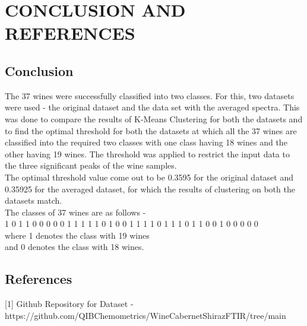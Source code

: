 \documentclass{article}
\begin{document}
\newpage
\section{CONCLUSION AND REFERENCES} 
\subsection{Conclusion}
The 37 wines were successfully classified into two classes. For this, two datasets were used - the original dataset and the data set with the averaged spectra. This was done to compare the results of K-Means Clustering for both the datasets and to find the optimal threshold for both the datasets at which all the 37 wines are classified into the required two classes with one class having 18 wines and the other having 19 wines. The threshold was applied to restrict the input data to the three significant peaks of the wine samples. \\
\newline
The optimal threshold value come out to be 0.3595 for the original dataset and 0.35925 for the averaged dataset, for which the results of clustering on both the datasets match.\\
\newline
The classes of 37 wines are as follows - \\
1 0 1 1 0 0 0 0 0 1 1 1 1 1 0 1 0 0 1 1 1 1 0 1 1 1 0 1 1 0 0 1 0 0 0 0 0\\
where 1 denotes the class with 19 wines \\
and 0 denotes the class with 18 wines.\\
\subsection{References}
[1] Github Repository for Dataset - https://github.com/QIBChemometrics/Wine\textunderscore Cabernet\textunderscore Shiraz\textunderscore FTIR/tree/main
\end{document}
